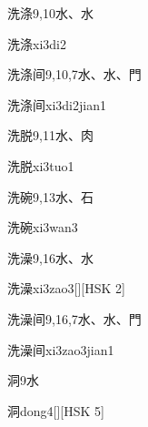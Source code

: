 \begin{entry}{洗涤}{9,10}{⽔、⽔}
  \begin{phonetics}{洗涤}{xi3di2}
  \end{phonetics}
\end{entry}

\begin{entry}{洗涤间}{9,10,7}{⽔、⽔、⾨}
  \begin{phonetics}{洗涤间}{xi3di2jian1}
  \end{phonetics}
\end{entry}

\begin{entry}{洗脱}{9,11}{⽔、⾁}
  \begin{phonetics}{洗脱}{xi3tuo1}
  \end{phonetics}
\end{entry}

\begin{entry}{洗碗}{9,13}{⽔、⽯}
  \begin{phonetics}{洗碗}{xi3wan3}
  \end{phonetics}
\end{entry}

\begin{entry}{洗澡}{9,16}{⽔、⽔}
  \begin{phonetics}{洗澡}{xi3zao3}[][HSK 2]
  \end{phonetics}
\end{entry}

\begin{entry}{洗澡间}{9,16,7}{⽔、⽔、⾨}
  \begin{phonetics}{洗澡间}{xi3zao3jian1}
  \end{phonetics}
\end{entry}

\begin{entry}{洞}{9}{⽔}
  \begin{phonetics}{洞}{dong4}[][HSK 5]
  \end{phonetics}
\end{entry}

